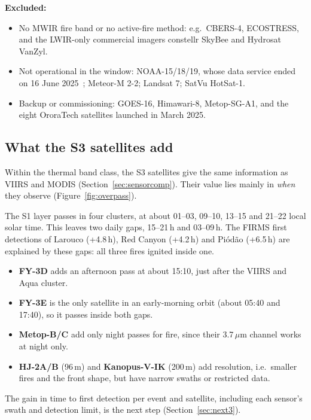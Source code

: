 \documentclass[11pt]{article}
\begin{document}
\textbf{Excluded:}
\begin{itemize}[leftmargin=1.2cm]
    \item No MWIR fire band or no active-fire method: e.g.\ CBERS-4, ECOSTRESS, and the LWIR-only commercial imagers constellr SkyBee and Hydrosat VanZyl.
    \item Not operational in the window: NOAA-15/18/19, whose data service ended on 16 June 2025~\cite{noaa2025poes}; Meteor-M 2-2; Landsat 7; SatVu HotSat-1.
    \item Backup or commissioning: GOES-16, Himawari-8, Metop-SG-A1, and the eight OroraTech satellites launched in March 2025.
\end{itemize}

\subsection{What the S3 satellites add}

Within the thermal band class, the S3 satellites give the same information as VIIRS and MODIS (Section~\ref{sec:sensorcomp}). Their value lies mainly in \emph{when} they observe (Figure~\ref{fig:overpass}).

The S1 layer passes in four clusters, at about 01--03, 09--10, 13--15 and 21--22 local solar time. This leaves two daily gaps, 15--21\,h and 03--09\,h. The FIRMS first detections of Larouco (+4.8\,h), Red Canyon (+4.2\,h) and Pi\'od\~ao (+6.5\,h) are explained by these gaps: all three fires ignited inside one.

\begin{itemize}[leftmargin=1.2cm]
    \item \textbf{FY-3D} adds an afternoon pass at about 15:10, just after the VIIRS and Aqua cluster.
    \item \textbf{FY-3E} is the only satellite in an early-morning orbit (about 05:40 and 17:40), so it passes inside both gaps.
    \item \textbf{Metop-B/C} add only night passes for fire, since their 3.7\,$\mu$m channel works at night only.
    \item \textbf{HJ-2A/B} (96\,m) and \textbf{Kanopus-V-IK} (200\,m) add resolution, i.e.\ smaller fires and the front shape, but have narrow swaths or restricted data.
\end{itemize}

The gain in time to first detection per event and satellite, including each sensor's swath and detection limit, is the next step (Section~\ref{sec:next3}).
\end{document}
